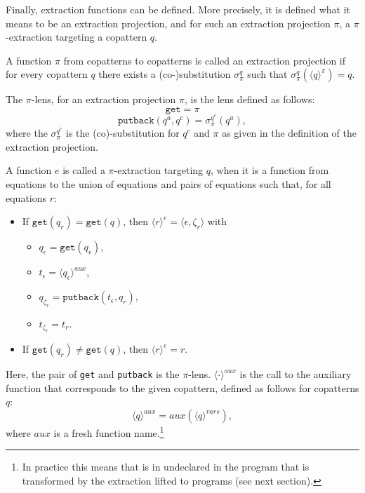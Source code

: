 Finally, extraction functions can be defined. More precisely, it is defined what it means to be an extraction projection, and for such an extraction projection $\pi$, a $\pi$-extraction targeting a copattern $q$.

\begin{definition}
A function $\pi$ from copatterns to copatterns is called an extraction projection if for every copattern $q$ there exists a (co-)substitution $\sigma^q_\pi$ such that $\sigma^q_\pi(\langle q \rangle^\pi) = q$.
\end{definition}

\begin{definition}[$\pi$-lens]
The $\pi$-lens, for an extraction projection $\pi$, is the lens defined as follows:
\[
\mathtt{get} = \pi
\]
\[
\mathtt{putback}(q^a, q^c) = \sigma^{q^c}_\pi(q^a),
\]
where the $\sigma^{q^c}_\pi$ is the (co)-substitution for $q^c$ and $\pi$ as given in the definition of the extraction projection.
\end{definition}

\begin{definition}
A function $e$ is called a $\pi$-extraction targeting $q$, when it is a function from equations to the union of equations and pairs of equations such that, for all equations $r$:
\begin{itemize}
\item If $\mathtt{get}(q_r) = \mathtt{get}(q)$, then $\langle r \rangle^e = \big\langle \epsilon, \zeta_r \big\rangle$ with
\begin{itemize}
\item $q_\epsilon = \mathtt{get}(q_r)$,
\item $t_\epsilon = \langle q_\epsilon \rangle^{aux}$,
\item $q_{\zeta_r} = \mathtt{putback}(t_\epsilon, q_r)$,
\item $t_{\zeta_r} = t_r$.
\end{itemize}

\item If $\mathtt{get}(q_r) \neq \mathtt{get}(q)$, then $\langle r \rangle^e = r$.
\end{itemize}
Here, the pair of \texttt{get} and \texttt{putback} is the $\pi$-lens. $\langle \cdot \rangle^{aux}$ is the call to the auxiliary function that corresponds to the given copattern, defined as follows for copatterns $q$:
\[
\langle q \rangle^{aux} = aux(\langle q \rangle^{vars}),
\]
where $aux$ is a fresh function name.\footnote{In practice this means that is in undeclared in the program that is transformed by the extraction lifted to programs (see next section).}
\end{definition}

